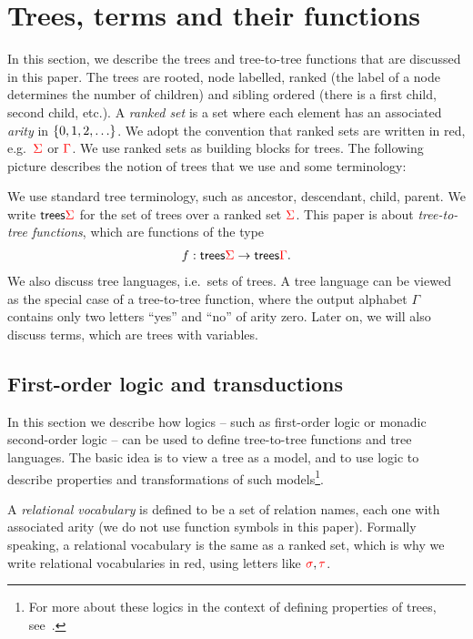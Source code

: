 \section{Trees, terms and their functions}
\label{sec:trees-transductions}
 In this section, we describe the trees and tree-to-tree functions that are discussed in this paper. The  trees are rooted, node labelled, ranked (the label of a node determines the number of children) and sibling ordered (there is a first child, second child, etc.). 
A \emph{ranked set} is a set where each element has an associated \emph{arity} in $\{0,1,2,\ldots\}$. We adopt the convention that ranked sets are written in red, e.g.~${\color{red}{\Sigma}}$ or ${\color{red}{\Gamma}}$.  We use ranked sets as building blocks for trees. The following picture describes the notion of trees that we use and some terminology:

We use standard tree terminology, such as ancestor, descendant, child, parent. We write $\mathsf {trees} {\color{red}{\Sigma}}$ for the set of trees over a ranked set ${\color{red}{\Sigma}}$. This paper is about \emph{tree-to-tree functions}, which are functions of the type \begin{align*}
f : \mathsf {trees} {\color{red}{\Sigma}} \to \mathsf {trees} {\color{red}{\Gamma}}.
\end{align*}
We also discuss tree languages, i.e.~sets of trees. 
A tree language can be viewed as the special case of a tree-to-tree function, where the output alphabet $\Gamma$ contains only two letters ``yes'' and ``no'' of arity zero. Later on, we will also discuss terms, which are trees with variables. 

  
\subsection{First-order logic and transductions}
In this section we  describe how logics -- such as first-order logic or monadic second-order logic -- can be used to define tree-to-tree functions and tree languages. The basic idea is to view a tree as a model, and to use logic to describe properties and transformations of such models\footnote{For more about these logics in the context of defining properties of trees, see~\cite[Section 3]{thomas1997languages}.}. 

A \emph{relational vocabulary} is defined to be a set of relation names, each one with associated arity (we do not use function symbols in this paper). Formally speaking, a relational vocabulary is the same as a ranked set, which is why we write relational vocabularies in red, using letters like ${\color{red}{\sigma}}, {\color{red}{\tau}}$. 

